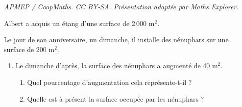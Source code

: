 \documentclass[10pt]{article}
\begin{document}
\noindent\textit{APMEP / CoopMaths. CC BY-SA. Présentation adaptée par Maths Explorer.}\par\medskip
\begin{minipage}[t]{0.65\textwidth}
Albert a acquis un étang d'une surface de 2\,000 m$^2$.

Le jour de son anniversaire, un dimanche, il installe des nénuphars sur une surface de 200 m$^2$.

\begin{enumerate}
\item Le dimanche d'après, la surface des nénuphars a augmenté de 40 m$^2$.
\begin{enumerate}
\item Quel pourcentage d'augmentation cela représente-t-il ?
\item Quelle est à présent la surface occupée par les nénuphars ?
\end{enumerate}
\end{enumerate}
\end{minipage}
\hfill
\begin{minipage}[t]{0.3\textwidth}
\vspace{0pt}
\begin{center}
\end{center}
\end{minipage}
\end{document}
